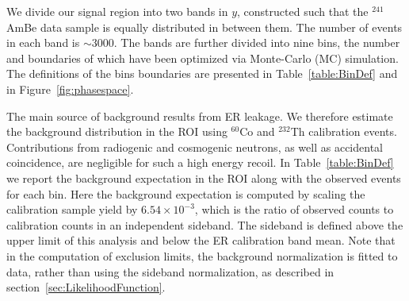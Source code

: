 We divide our signal region into two bands in $y$, constructed such that the $^{241}$AmBe data sample is equally distributed in between them. The number of events in each band is $\sim3000$. The bands are further divided into nine bins, the number and boundaries of which have been optimized via Monte-Carlo (MC) simulation. The definitions of the bins boundaries are presented in Table~\ref{table:BinDef} and in Figure~\ref{fig:phasespace}. 

The main source of background results from ER leakage. We therefore estimate the background distribution in the ROI using $^{60}$Co and $^{232}$Th calibration events.  
Contributions from radiogenic and cosmogenic neutrons, as well as accidental coincidence, are negligible for such a high energy recoil. In Table~\ref{table:BinDef} we report the 
background expectation in the ROI along with the observed events for each bin.
Here the background expectation is computed by scaling the calibration sample yield by $6.54\times10^{-3}$, which is the ratio of observed counts to calibration counts in an independent sideband. The sideband is defined above the upper limit of this analysis and below the ER calibration band mean. Note that in the computation of exclusion limits, the background normalization is fitted to data, rather than using the sideband normalization, as described in section~\ref{sec:LikelihoodFunction}. 



\begin{table}

\caption{Definitions and contents of the analysis bins for the high energy channel. The expected background counts are calculated by taking the calibration sample and scaling it by $6.54\times10^{-3}$, which is the ratio of observed counts to calibration counts in a sideband.}  \label{table:BinDef} 
\end{table}







